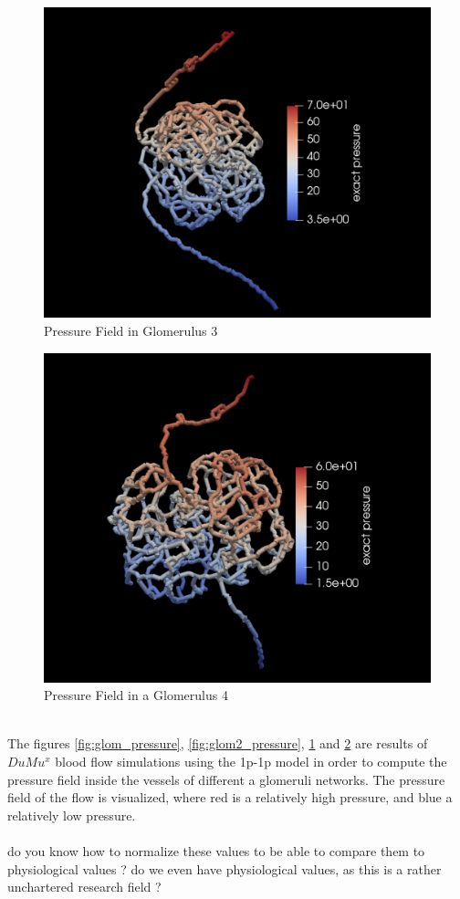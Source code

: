 \begin{figure}[h]
\centering
\includegraphics[width=162mm]{glom3_pressure}
\caption{Pressure Field in Glomerulus 3}
\label{fig:glom3_pressure}
\end{figure}
\begin{figure}[h]
\centering
\includegraphics[width=162mm]{glom4_pressure}
\caption{Pressure Field in a Glomerulus 4}
\label{fig:glom4_pressure}
\end{figure}\\
The figures \ref{fig:glom_pressure},  \ref{fig:glom2_pressure},  \ref{fig:glom3_pressure} and  \ref{fig:glom4_pressure} are results of $DuMu^x$ blood flow simulations using the 1p-1p model in order to compute the pressure field inside the vessels of different a glomeruli networks. The pressure field of the flow is visualized, where red is a relatively high pressure, and blue a relatively low pressure.\\
\\{\color{red} do you know how to normalize these values to be able to compare them to physiological values ? do we even have physiological values, as this is a rather unchartered research field ?}

